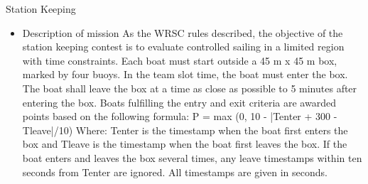 \item{Station Keeping}
\begin{itemize}
\item{Description of mission}
As the WRSC rules described, the objective of the station keeping contest is to evaluate controlled sailing in a limited region with time constraints. Each boat must start outside a 45 m x 45 m box, marked by four buoys. In the team slot time, the boat must enter the box. The boat shall leave the box at a time as close as possible to 5 minutes after entering the box. Boats fulfilling the entry and exit criteria are awarded points based on the following formula:
P = max (0, 10 - |Tenter + 300 - Tleave|/10)
Where: Tenter is the timestamp when the boat first enters the box and Tleave is the timestamp
when the boat first leaves the box. If the boat enters and leaves the box several times, any leave timestamps within ten seconds from Tenter are ignored. All timestamps are given in seconds.
\end{itemize}